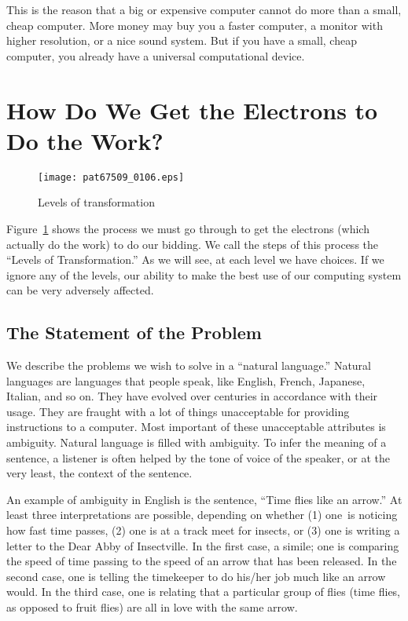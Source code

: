 \documentclass{patt}
\begin{document}
This is the reason that a big or expensive computer cannot do
more than a small, cheap computer.  More money
may buy you a faster computer, a monitor with higher resolution,
or a nice sound system.  But if you have a small, cheap computer,
you already have a universal computational device.

\vspace{-12pt}
\section{How Do We Get the Electrons to Do the Work?}

\begin{figure}
\vspace{-6pt}
\centerline{\texttt{[image: pat67509\_0106.eps]}}
\caption{Levels of transformation}
\label{fig:levels}
\end{figure}

Figure~\ref{fig:levels} shows the process we must go through to get the 
electrons (which actually do the work) to do our bidding.  We call the 
steps\vadjust{\vfill\pagebreak}
of this process the ``Levels of Transformation.''  As we will see, at
each level we have choices.  If we ignore any of the levels, our
ability to make the best use of our computing system can be very adversely
affected.

\FloatBarrier
\subsection{The Statement of the Problem}

We describe the problems we wish to solve in a ``natural
\nobreak language.''  Natural languages are languages that people speak, like
English, French, Japanese, Italian, and so on.
They have evolved over centuries in accordance
with their usage.  They are fraught with a lot of things unacceptable
for providing instructions to a computer.  Most important of these
unacceptable attributes is ambiguity.  Natural language is filled with
ambiguity. To infer the meaning of a sentence, a listener is often helped by
the tone of voice of the speaker, or at the very least, the context of
the sentence.

An example of ambiguity in English is the sentence, ``Time flies like an
arrow.''  At least three interpretations are possible, depending on whether
(1) one~is noticing how fast time passes, (2) one is at a track meet for
insects, or (3) one is writing a letter to the Dear Abby of Insectville.
In the first case, a simile; one is comparing the speed of time passing
to the speed of an arrow that
has been released.  In the second case, one is telling the
timekeeper to do his/her job much like an arrow would.  In the
third case, one is relating that a particular group of flies (time flies,
as opposed to fruit flies) are all in love with the same arrow.
\end{document}
